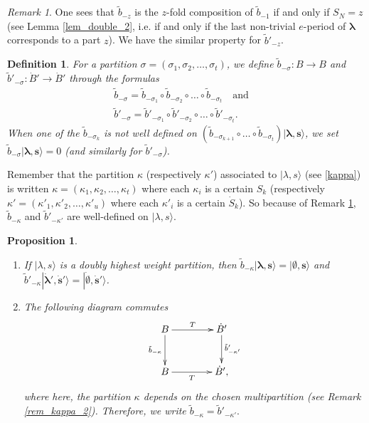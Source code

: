 \documentclass[twoside,12pt]{amsart}
\theoremstyle{plain}
\newcommand{\bs}{\mathbf{s}}
\newcommand{\si}{\sigma}
\newcommand{\la}{\lambda}
\newcommand{\ka}{\kappa}
\newcommand{\bla}{\boldsymbol{\la}}
\newcommand{\tb}{\tilde{b}}
\newcommand{\dS}{\dot{S}}
\newcommand{\dB}{\dot{B}}
\newcommand{\dbs}{\dot{\bs}}
\newcommand{\dbla}{\dot{\bla}}
\newcommand{\lra}{\longrightarrow}
\newcommand{\mand}{\quad\text{and}\quad}
\newcommand{\bemp}{\boldsymbol{\emptyset}}
\newcommand{\dbemp}{\dot{\bemp}}
\newtheorem{defi}[num]{Definition}
\newtheorem{prop}[num]{Proposition}
\theoremstyle{remark}
\newtheorem{rem}[num]{Remark}
\begin{document}
\begin{rem}\label{rem_btildez}
One sees that $\tb_{-z}$ is the $z$-fold composition of $\tb_{-1}$ if and only if $S_{N} = z$
(see Lemma \ref{lem_double_2}, i.e. if and only if the last non-trivial $e$-period of $\bla$ corresponds to a part $z$).
We have the similar property for $\tb'_{-z}$.
\end{rem}


\begin{defi}\label{def_btildepart}
For a partition $\si=(\si_1,\si_2,\dots,\si_t)$,
we define $\tb_{-\si} :  B   \lra  B$ and $\tb'_{-\si} :  \dB'   \lra  \dB'$
through the formulas
\begin{equation}
\begin{array}{l}
\tb_{-\si} = \tb_{-\si_1}\circ\tb_{-\si_2}\circ\dots\circ\tb_{-\si_t} \mand \\
\tb'_{-\si} = \tb'_{-\si_1}\circ\tb'_{-\si_2}\circ\dots\circ\tb'_{-\si_t}.
\end{array}
\end{equation} 
When one of the $\tb_{-\si_k}$ is not well defined on 
$(\tb_{-\si_{k+1}}\circ\dots\circ\tb_{-\si_t})|\bla,\bs\rangle$, 
we set $\tb_{-\si}|\bla,\bs\rangle=0$
(and similarly for $\tb'_{-\si}$).
\end{defi}


Remember that the partition $\ka$ (respectively $\ka'$) 
associated to $|\la,s\rangle$ (see \ref{kappa})
is written $\ka=(\ka_1,\ka_2,\dots,\ka_t)$ where each $\ka_i$ is a certain $S_{k}$
(respectively $\ka'=(\ka'_1,\ka'_2,\dots,\ka'_u)$ where each $\ka'_i$ is a certain $\dS_{k}$).
So because of Remark \ref{rem_btildez}, $\tb_{-\ka}$ and $\tb'_{-\ka'}$
are well-defined on $|\la,s\rangle$.


\begin{prop}\label{prop_btildekappa_1}\
\begin{enumerate}
 \item If $|\la,s\rangle$ is a doubly highest weight partition,
then $\tb_{-\ka}|\bla,\bs\rangle=|\bemp,\bs\rangle$
and $\tb'_{-\ka}|\dbla',\dbs'\rangle=|\dbemp,\dbs'\rangle$.
\item The following diagram commutes
$$ \xymatrix@!0 @R=1.5cm @C=2cm{
  B  \ar[r]^-{T}\ar[d]_-{\tb_{-\ka}}
&
  \dB' 
  \ar[d]^-{\tb'_{-\ka'}} 
\\
    B \ar[r]_-{T}
&
   \dB',
  }$$
where here, the partition $\ka$ depends on
the chosen multipartition (see Remark \ref{rem_kappa_2}).
Therefore, we write $\tb_{-\ka} = \tb'_{-\ka'}.$
\end{enumerate}

\end{prop}
\end{document}
